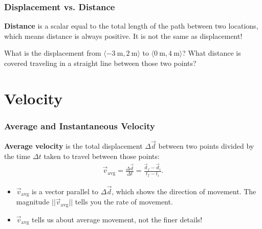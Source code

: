 \documentclass[20pt]{beamer}
\begin{document}
\begin{frame}
	\frametitle{Displacement vs. Distance}
	\begin{figure}[ht]
		\centering
		\label{fig:distancedisplacement}
	\end{figure}
	\begin{definition}
		\textbf{Distance} is a scalar equal to the total length of the path between two locations, which means distance is always positive. It is not the same as displacement!
	\end{definition}

	\begin{example}
		What is the displacement from $\langle \SI{-3}{\meter}, \SI{2}{\meter} \rangle$ to $\langle \SI{0}{\meter}, \SI{4}{\meter} \rangle$? What distance is covered traveling in a straight line between those two points?
	\end{example}
\end{frame}

\section{Velocity}

\begin{frame}
	\frametitle{Average and Instantaneous Velocity}
	\begin{definition}
		\textbf{Average velocity} is the total displacement $\Delta \vec{d}$ between two points divided by the time $\Delta t$ taken to travel between those points:
		\begin{align*}
			\vec{v}_\mathrm{avg} = \frac{\Delta \vec{d}}{\Delta t} = \frac{\vec{d}_f - \vec{d}_i}{t_f - t_i}.
		\end{align*}
	\end{definition}

	\begin{itemize}
		\item $\vec{v}_\mathrm{avg}$ is a vector parallel to $\Delta \vec{d}$, which shows the direction of movement. The magnitude $||\vec{v}_\mathrm{avg}||$ tells you the rate of movement.
		\item $\vec{v}_\mathrm{avg}$ tells us about average movement, not the finer details!
	\end{itemize}

	\begin{figure}[ht]
		\centering
		\label{fig:averagevelocity}
	\end{figure}
\end{frame}
\end{document}
